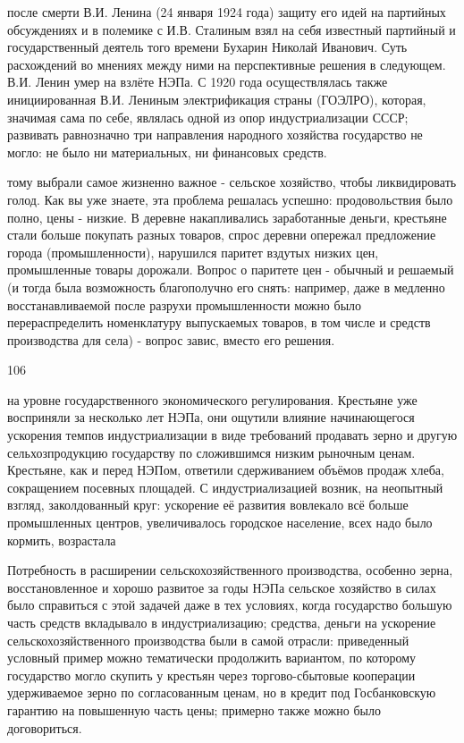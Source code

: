 после смерти
В.И. Ленина (24 января 1924 года) защиту его идей на партийных обсуждениях и в полемике с И.В. Сталиным взял на себя известный партийный и государственный деятель того времени Бухарин Николай Иванович. Суть расхождений во мнениях между ними на перспективные решения в следующем. В.И. Ленин умер на взлёте НЭПа. С 1920 года осуществлялась также инициированная В.И. Лениным электрификация страны (ГОЭЛРО), которая, значимая сама по себе, являлась одной из опор индустриализации СССР; развивать равнозначно три направления народного хозяйства государство не могло: не было ни материальных, ни финансовых средств.

тому выбрали самое жизненно важное - сельское хозяйство, чтобы ликвидировать голод. Как вы уже знаете, эта проблема решалась успешно: продовольствия было полно, цены - низкие. В деревне накапливались заработанные деньги, крестьяне стали больше покупать разных товаров, спрос деревни опережал предложение города (промышленности), нарушился паритет вздутых низких цен, промышленные товары дорожали. Вопрос о паритете цен - обычный и решаемый (и тогда была возможность благополучно его снять: например, даже в медленно восстанавливаемой после разрухи промышленности можно было перераспределить номенклатуру выпускаемых товаров, в том числе и средств производства для села) - вопрос завис, вместо его решения.

106

на уровне государственного экономического регулирования. Крестьяне уже восприняли за несколько лет НЭПа, они ощутили влияние начинающегося ускорения темпов индустриализации в виде требований продавать зерно и другую сельхозпродукцию государству по сложившимся низким рыночным ценам. Крестьяне, как и перед НЭПом, ответили сдерживанием объёмов продаж хлеба, сокращением посевных площадей. С индустриализацией возник, на неопытный взгляд, заколдованный круг: ускорение её развития вовлекало всё больше промышленных центров, увеличивалось городское население, всех надо было кормить, возрастала

Потребность в расширении сельскохозяйственного производства, особенно зерна, восстановленное и хорошо развитое за годы НЭПа сельское хозяйство в силах было справиться с этой задачей даже в тех условиях, когда государство большую часть средств вкладывало в индустриализацию; средства, деньги на ускорение сельскохозяйственного производства были в самой отрасли: приведенный условный пример можно тематически продолжить вариантом, по которому государство могло скупить у крестьян через торгово-сбытовые кооперации удерживаемое зерно по согласованным ценам, но в кредит под Госбанковскую гарантию на повышенную часть цены; примерно также можно было договориться.

